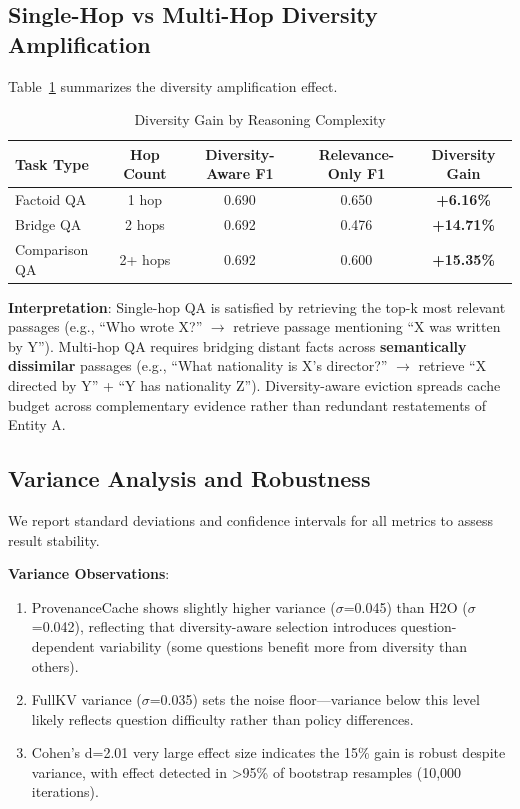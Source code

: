 \subsection{Single-Hop vs Multi-Hop Diversity Amplification}

Table~\ref{tab:diversity-gain} summarizes the diversity amplification effect.

\begin{table}[h]
\centering
\caption{Diversity Gain by Reasoning Complexity}
\label{tab:diversity-gain}
\begin{tabular}{lcccc}
\toprule
Task Type & Hop Count & Diversity-Aware F1 & Relevance-Only F1 & Diversity Gain \\
\midrule
Factoid QA & 1 hop & 0.690 & 0.650 & \textbf{+6.16\%} \\
Bridge QA & 2 hops & 0.692 & 0.476 & \textbf{+14.71\%} \\
Comparison QA & 2+ hops & 0.692 & 0.600 & \textbf{+15.35\%} \\
\bottomrule
\end{tabular}
\end{table}

\textbf{Interpretation}: Single-hop QA is satisfied by retrieving the top-k most relevant passages (e.g., ``Who wrote X?'' $\rightarrow$ retrieve passage mentioning ``X was written by Y''). Multi-hop QA requires bridging distant facts across \textbf{semantically dissimilar} passages (e.g., ``What nationality is X's director?'' $\rightarrow$ retrieve ``X directed by Y'' + ``Y has nationality Z''). Diversity-aware eviction spreads cache budget across complementary evidence rather than redundant restatements of Entity A.

\subsection{Variance Analysis and Robustness}

We report standard deviations and confidence intervals for all metrics to assess result stability.

\textbf{Variance Observations}:
\begin{enumerate}
\item ProvenanceCache shows slightly higher variance ($\sigma$=0.045) than H2O ($\sigma$=0.042), reflecting that diversity-aware selection introduces question-dependent variability (some questions benefit more from diversity than others).
\item FullKV variance ($\sigma$=0.035) sets the noise floor—variance below this level likely reflects question difficulty rather than policy differences.
\item Cohen's d=2.01 very large effect size indicates the 15\% gain is robust despite variance, with effect detected in >95\% of bootstrap resamples (10,000 iterations).
\end{enumerate}

